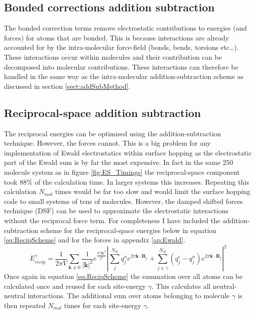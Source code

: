 \subsection{Bonded corrections addition subtraction}
The bonded correction terms remove electrostatic contributions to energies (and forces) for atoms that are bonded. This is because interactions are already accounted for by the intra-molecular force-field (bonds, bends, torsions etc\ldots). These interactions occur within molecules and their contribution can be decomposed into molecular contributions. These interactions can therefore be handled in the same way as the intra-molecular addition-subtraction scheme as discussed in section \ref{sect:addSubMethod}.
\subsection{Reciprocal-space addition subtraction}
The reciprocal energies can be optimised using the addition-subtraction technique. However, the forces cannot. This is a big problem for any implementation of Ewald electrostatics within surface hopping as the electrostatic part of the Ewald sum is by far the most expensive. In fact in the same 250 molecule system as in figure \ref{fig:ES_Timings} the reciprocal-space component took 88\% of the calculation time. In larger systems this increases. Repeating this calculation $N_{mol}$ times would be far too slow and would limit the surface hopping code to small systems of tens of molecules. However, the damped shifted forces technique (DSF) \cite{DSF} can be used to approximate the electrostatic interactions without the reciprocal force term. For completeness I have included the addition-subtraction scheme for the reciprocal-space energies below in equation \eqref{eq:RecipScheme} and for the forces in appendix \ref{ap:Ewald}.
\begin{equation}
  E^{\gamma}_{recip} = \frac{1}{2 \pi V} \sum_{\mathbf{k} \neq 0} \frac{1}{|\mathbf{k}|^2} e^{\frac{\pi^2 |\mathbf{k}|^2}{\eta^2}} \left| \sum_{j}^{N_{at}} q^{n}_{j} e^{2 \pi \mathbf{k} \cdot \mathbf{R}_{j}}  + \sum_{j \in \gamma}^{N_{at}} (q^{c}_{j} - q^n_j) e^{2 \pi \mathbf{k} \cdot \mathbf{R}_{j}} \right| ^2
  \label{eq:RecipScheme}
\end{equation}
Once again in equation \eqref{eq:RecipScheme} the summation over all atoms can be calculated once and reused for each site-energy $\gamma$. This calculates all neutral-neutral interactions. The additional sum over atoms belonging to molecule $\gamma$ is then repeated $N_{mol}$ times for each site-energy $\gamma$.
